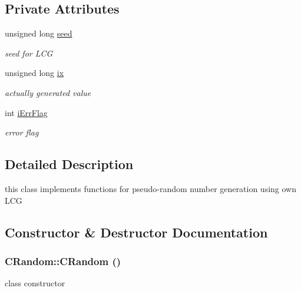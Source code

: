 \subsection*{Private Attributes}
\begin{DoxyCompactItemize}
\item 
\hypertarget{classCRandom_a7f0fa2c09ff5e3b61bde0290b789eaff}{
unsigned long \hyperlink{classCRandom_a7f0fa2c09ff5e3b61bde0290b789eaff}{seed}}
\label{classCRandom_a7f0fa2c09ff5e3b61bde0290b789eaff}

\begin{DoxyCompactList}\small\item\em seed for LCG \item\end{DoxyCompactList}\item 
\hypertarget{classCRandom_afb437854828457285f5b6ba5b9a7f8c9}{
unsigned long \hyperlink{classCRandom_afb437854828457285f5b6ba5b9a7f8c9}{ix}}
\label{classCRandom_afb437854828457285f5b6ba5b9a7f8c9}

\begin{DoxyCompactList}\small\item\em actually generated value \item\end{DoxyCompactList}\item 
\hypertarget{classCRandom_acb0b4ab77c79dc02cd2928be318a9b56}{
int \hyperlink{classCRandom_acb0b4ab77c79dc02cd2928be318a9b56}{iErrFlag}}
\label{classCRandom_acb0b4ab77c79dc02cd2928be318a9b56}

\begin{DoxyCompactList}\small\item\em error flag \item\end{DoxyCompactList}\end{DoxyCompactItemize}


\subsection{Detailed Description}
this class implements functions for pseudo-\/random number generation using own LCG 

\subsection{Constructor \& Destructor Documentation}
\hypertarget{classCRandom_a5f9d8f408ffab0a25630e8d4f529294a}{
\subsubsection[{CRandom}]{\setlength{\rightskip}{0pt plus 5cm}CRandom::CRandom ()}}
\label{classCRandom_a5f9d8f408ffab0a25630e8d4f529294a}
class constructor 

